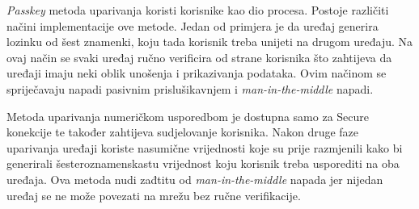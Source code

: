 \documentclass[times, utf8, diplomski]{fer}
\begin{document}
\emph{Passkey} metoda uparivanja koristi korisnike kao dio procesa. Postoje različiti načini implementacije ove metode. Jedan od primjera je da uređaj generira lozinku od šest znamenki, koju tada korisnik treba unijeti na drugom uređaju. Na ovaj način se svaki uređaj ručno verificira od strane korisnika što zahtijeva da uređaji imaju neki oblik unošenja i prikazivanja podataka. Ovim načinom se spriječavaju napadi pasivnim prislušikavnjem i \emph{man-in-the-middle} napadi.

Metoda uparivanja numeričkom usporedbom je dostupna samo za Secure konekcije te također zahtijeva sudjelovanje korisnika. Nakon druge faze uparivanja uređaji koriste nasumične vrijednosti koje su prije razmjenili kako bi generirali šesteroznamenskastu vrijednost koju korisnik treba usporediti na oba uređaja. Ova metoda nudi zađtitu od \emph{man-in-the-middle} napada jer nijedan uređaj se ne može povezati na mrežu bez ručne verifikacije\citep{Kacherovska2019Aug}.

\end{document}
